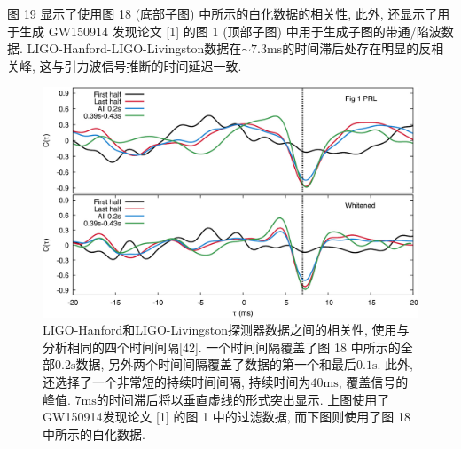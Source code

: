 \documentclass[a4paper]{\documentclassname}
\def\t{\text}
\theoremstyle{definition}
\begin{document}
图 19 显示了使用图 18 (底部子图) 中所示的白化数据的相关性, 此外, 还显示了用于生成 GW150914 发现论文 [1] 的图 1 (顶部子图) 中用于生成子图的带通/陷波数据. LIGO-Hanford-LIGO-Livingston数据在$\sim7.3 \t{ms}$的时间滞后处存在明显的反相关峰, 这与引力波信号推断的时间延迟一致. 
\begin{figure}[htbp]
    \centering
    \includegraphics{img/19.jpg}
    \caption{
        LIGO-Hanford和LIGO-Livingston探测器数据之间的相关性, 使用与分析相同的四个时间间隔[42]. 一个时间间隔覆盖了图 18 中所示的全部$0.2 \t{s}$数据, 另外两个时间间隔覆盖了数据的第一个和最后$0.1 \t{s}$. 此外, 还选择了一个非常短的持续时间间隔, 持续时间为$40 \t{ms}$, 覆盖信号的峰值. $7 \t{ms}$的时间滞后将以垂直虚线的形式突出显示. 上图使用了GW150914发现论文 [1] 的图 1 中的过滤数据, 而下图则使用了图 18 中所示的白化数据. 
    }
\end{figure}
\end{document}
